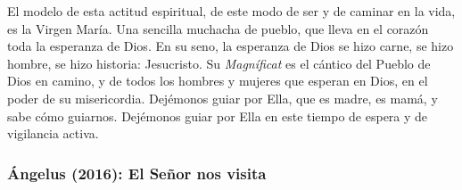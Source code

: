 \begin{body}
					El modelo de esta actitud espiritual, de este modo de ser y de caminar en la vida, es la Virgen María. Una sencilla muchacha de pueblo, que lleva en el corazón toda la esperanza de Dios. En su seno, la esperanza de Dios se hizo carne, se hizo hombre, se hizo historia: Jesucristo. Su \emph{Magníficat} es el cántico del Pueblo de Dios en camino, y de todos los hombres y mujeres que esperan en Dios, en el poder de su misericordia. Dejémonos guiar por Ella, que es madre, es mamá, y sabe cómo guiarnos. Dejémonos guiar por Ella en este tiempo de espera y de vigilancia activa.
				\end{body}
		
			\subsubsection{Ángelus (2016): El Señor nos visita}
			
			
